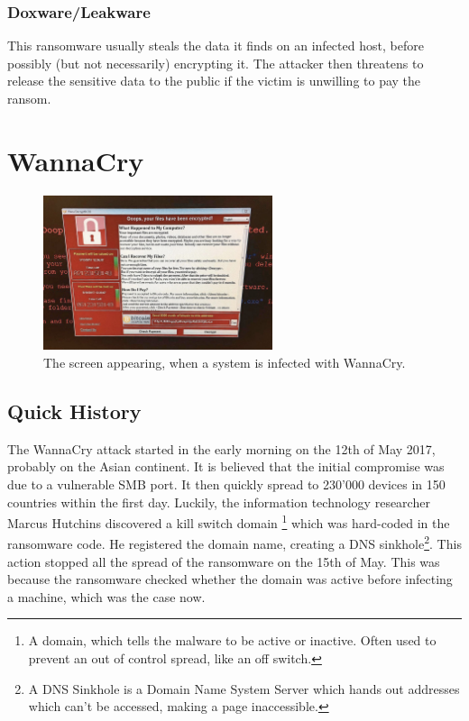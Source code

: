 \subsection{Doxware/Leakware}

This ransomware usually steals the data it finds on an infected host, before possibly (but not necessarily) encrypting it.
The attacker then threatens to release the sensitive data to the public if the victim is unwilling to pay the ransom.

\chapter{WannaCry}

\begin{figure}[h!p]
    \centering
    \includegraphics[width=0.6\textwidth]{./images_malware/WannaCry_screen_III.jpeg}
    \caption{The screen appearing, when a system is infected with WannaCry.}
    \label{img:wannacry}
\end{figure}

\section{Quick History}

The WannaCry attack started in the early morning on the 12th of May 2017, probably on the Asian continent.
It is believed that the initial compromise was due to a vulnerable %
SMB port.
It then quickly spread to 230'000 devices in 150 countries within the first day.
Luckily, the information technology researcher Marcus Hutchins%
discovered a kill switch domain \footnote{A domain, which tells the malware to be active or inactive. Often used to prevent an out of control spread, like an off switch.} which was hard-coded in the ransomware code.
\label{sec:killswitch}
He registered the domain name, creating a DNS sinkhole\footnote{A DNS Sinkhole is a Domain Name System Server which hands out addresses which can't be accessed, making a page inaccessible.}.
This action stopped all the spread of the ransomware on the 15th of May.
This was because the ransomware checked whether the domain was active before infecting a machine, which was the case now.
\\

